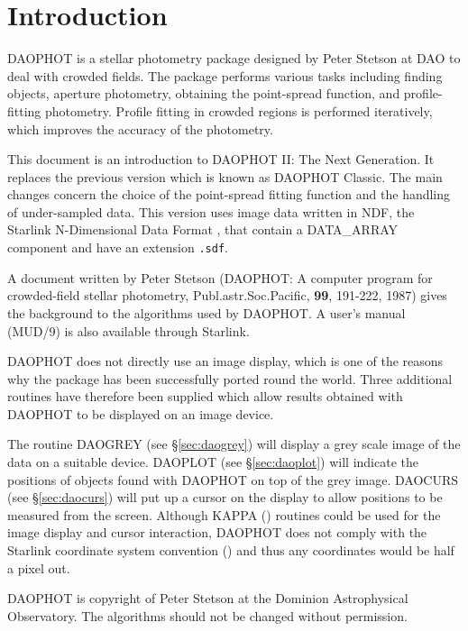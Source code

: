 \documentclass[11pt,nolof]{starlink}
\begin{document}
\scfrontmatter

\section{Introduction}
\label{sec:intro}

DAOPHOT is a stellar photometry package designed by Peter Stetson at DAO to deal
with crowded fields. The package performs various tasks including
finding objects, aperture photometry, obtaining the point-spread function, and
profile-fitting photometry. Profile fitting in crowded regions is performed
iteratively, which improves the accuracy of the photometry.

This document is an introduction to DAOPHOT II: The Next Generation. It replaces
the previous version which is known as DAOPHOT Classic. The main changes concern
the choice of the point-spread fitting function and the handling of under-sampled
data. This version uses image data written in NDF, the Starlink N-Dimensional
Data Format , that contain a DATA\_ARRAY component
and have an extension \texttt{.sdf}.

A document written by Peter Stetson (DAOPHOT: A computer program for crowded-field
stellar photometry, Publ.astr.Soc.Pacific, \textbf{99}, 191-222, 1987)
gives the background to the algorithms used by DAOPHOT. A user's manual (MUD/9)
is also available through Starlink.

DAOPHOT does not directly use an image display, which is one of the reasons why the
package has been successfully ported round the world. Three additional routines
have therefore been supplied which allow results obtained with DAOPHOT to be
displayed on an image device.

The routine DAOGREY (see \S{\ref{sec:daogrey}})
will display a grey scale image of the data on a suitable
device. DAOPLOT (see \S{\ref{sec:daoplot}})
will indicate the positions of objects found with DAOPHOT on top of
the grey image. DAOCURS (see \S{\ref{sec:daocurs}})
will put up a cursor on the display to allow positions to
be measured from the screen. Although KAPPA () routines could
be used for the image display and cursor interaction, DAOPHOT does not comply with
the Starlink coordinate system convention () and thus any
coordinates would be half a pixel out.

DAOPHOT is copyright of Peter Stetson at the Dominion Astrophysical Observatory.
The algorithms should not be changed without permission.
\end{document}
